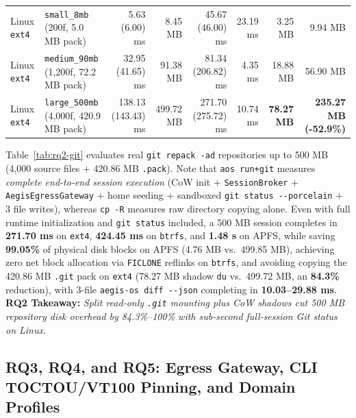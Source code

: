 \documentclass[10pt,twocolumn]{article}
\begin{document}
\begin{table}[!t]
{\begin{tabular}{@{}llrrrrrr@{}}
\midrule
Linux \texttt{ext4} & \texttt{small\_8mb} (200f, 5.0 MB pack) & 5.63 (6.00) ms & 8.45 MB & 45.67 (46.00) ms & 23.19 ms & 3.25 MB & 9.94 MB \\
Linux \texttt{ext4} & \texttt{medium\_90mb} (1,200f, 72.2 MB pack) & 32.95 (41.65) ms & 91.38 MB & 81.34 (206.82) ms & 4.35 ms & 18.88 MB & 56.90 MB \\
Linux \texttt{ext4} & \texttt{large\_500mb} (4,000f, 420.9 MB pack) & 138.13 (143.43) ms & 499.72 MB & 271.70 (275.72) ms & 10.74 ms & \textbf{78.27 MB} & \textbf{235.27 MB (-52.9\%)} \\
\bottomrule
\end{tabular}%
}
\end{table}

Table~\ref{tab:rq2-git} evaluates real \texttt{git repack -ad} repositories up to 500 MB (4,000 source files + 420.86 MB \texttt{.pack}). Note that \texttt{aos run+git} measures \emph{complete end-to-end session execution} (CoW init + \texttt{SessionBroker} + \texttt{AegisEgressGateway} + home seeding + sandboxed \texttt{git status -\/-porcelain} + 3 file writes), whereas \texttt{cp -R} measures raw directory copying alone. Even with full runtime initialization and \texttt{git status} included, a 500 MB session completes in \textbf{271.70 ms} on \texttt{ext4}, \textbf{424.45 ms} on \texttt{btrfs}, and \textbf{1.48 s} on APFS, while saving \textbf{99.05\%} of physical disk blocks on APFS (4.76 MB vs.\ 499.85 MB), achieving zero net block allocation via \texttt{FICLONE} reflinks on \texttt{btrfs}, and avoiding copying the 420.86 MB \texttt{.git} pack on \texttt{ext4} (78.27 MB shadow \texttt{du} vs.\ 499.72 MB, an \textbf{84.3\%} reduction), with 3-file \texttt{aegis-os diff -\/-json} completing in \textbf{10.03--29.88 ms}. \textbf{RQ2 Takeaway:} \emph{Split read-only \texttt{.git} mounting plus CoW shadows cut 500 MB repository disk overhead by 84.3\%--100\% with sub-second full-session Git status on Linux.}

\subsection{RQ3, RQ4, and RQ5: Egress Gateway, CLI TOCTOU/VT100 Pinning, and Domain Profiles}
\end{document}
